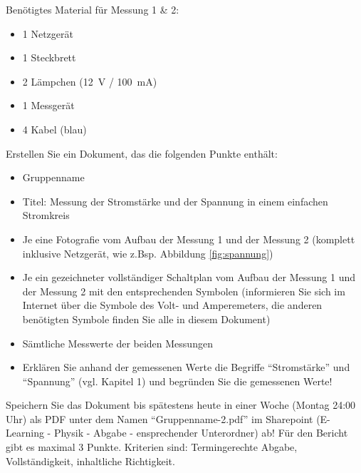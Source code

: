 \documentclass[11pt,twoside=false,open=any]{scrbook}
\begin{document}
\begin{tcolorbox}[breakable,colback=gray!20, title=Auftrag 2: Erste Messungen mit dem Multimeter]
Benötigtes Material für Messung 1 \& 2:
\begin{itemize}
    \item 1 Netzgerät
    \item 1 Steckbrett
    \item 2 Lämpchen (\SI{12}{V} / \SI{100}{mA})
    \item 1 Messgerät
    \item 4 Kabel (blau)
\end{itemize}
Erstellen Sie ein Dokument, das die folgenden Punkte enthält:
\begin{itemize}
    \item Gruppenname
    \item Titel: Messung der Stromstärke und der Spannung in einem einfachen Stromkreis
    \item Je eine Fotografie vom Aufbau der Messung 1 und der Messung 2 (komplett inklusive Netzgerät, wie z.Bsp. Abbildung \ref{fig:spannung})
    \item Je ein gezeichneter vollständiger Schaltplan vom Aufbau der Messung 1 und der Messung 2 mit den entsprechenden Symbolen (informieren Sie sich im Internet über die Symbole des Volt- und Amperemeters, die anderen benötigten Symbole finden Sie alle in diesem Dokument)
    \item Sämtliche Messwerte der beiden Messungen
    \item Erklären Sie anhand der gemessenen Werte die Begriffe ``Stromstärke'' und ``Spannung'' (vgl. Kapitel 1) und begründen Sie die gemessenen Werte!
\end{itemize}
Speichern Sie das Dokument bis spätestens heute in einer Woche (Montag 24:00 Uhr) als PDF unter dem Namen ``Gruppenname-2.pdf'' im Sharepoint (E-Learning  - Physik - Abgabe - ensprechender Unterordner) ab! Für den Bericht gibt es maximal 3 Punkte. Kriterien sind: Termingerechte Abgabe, Vollständigkeit, inhaltliche Richtigkeit.
\end{tcolorbox}
\end{document}
